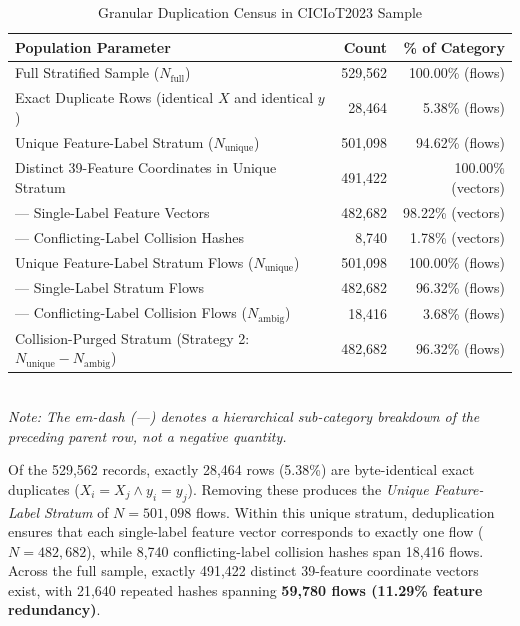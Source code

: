 \documentclass[conference,10pt,twocolumn]{IEEEtran}
\begin{document}
\begin{table}[h]
\centering
\caption{Granular Duplication Census in CICIoT2023 Sample}
\label{tab:duplication_census}
\small
\begin{tabular}{@{}lrr@{}}
\toprule
\textbf{Population Parameter} & \textbf{Count} & \textbf{\% of Category} \\ \midrule
Full Stratified Sample ($N_{\text{full}}$) & 529,562 & 100.00\% (flows) \\
Exact Duplicate Rows (identical $X$ and identical $y$) & 28,464 & 5.38\% (flows) \\
Unique Feature-Label Stratum ($N_{\text{unique}}$) & 501,098 & 94.62\% (flows) \\ \midrule
Distinct 39-Feature Coordinates in Unique Stratum & 491,422 & 100.00\% (vectors) \\
\quad --- Single-Label Feature Vectors & 482,682 & 98.22\% (vectors) \\
\quad --- Conflicting-Label Collision Hashes & 8,740 & 1.78\% (vectors) \\ \midrule
Unique Feature-Label Stratum Flows ($N_{\text{unique}}$) & 501,098 & 100.00\% (flows) \\
\quad --- Single-Label Stratum Flows & 482,682 & 96.32\% (flows) \\
\quad --- Conflicting-Label Collision Flows ($N_{\text{ambig}}$) & 18,416 & 3.68\% (flows) \\ \midrule
Collision-Purged Stratum (Strategy 2: $N_{\text{unique}} - N_{\text{ambig}}$) & 482,682 & 96.32\% (flows) \\ \bottomrule
\end{tabular}
  \vspace{1mm}\\
  {\footnotesize \textit{Note: The em-dash (---) denotes a hierarchical sub-category breakdown of the preceding parent row, not a negative quantity.}}
\end{table}

Of the 529,562 records, exactly 28,464 rows (5.38\%) are byte-identical exact duplicates ($X_i = X_j \land y_i = y_j$). Removing these produces the \textit{Unique Feature-Label Stratum} of $N = 501,098$ flows. Within this unique stratum, deduplication ensures that each single-label feature vector corresponds to exactly one flow ($N = 482,682$), while 8,740 conflicting-label collision hashes span 18,416 flows. Across the full sample, exactly 491,422 distinct 39-feature coordinate vectors exist, with 21,640 repeated hashes spanning \textbf{59,780 flows (11.29\% feature redundancy)}.
\end{document}

